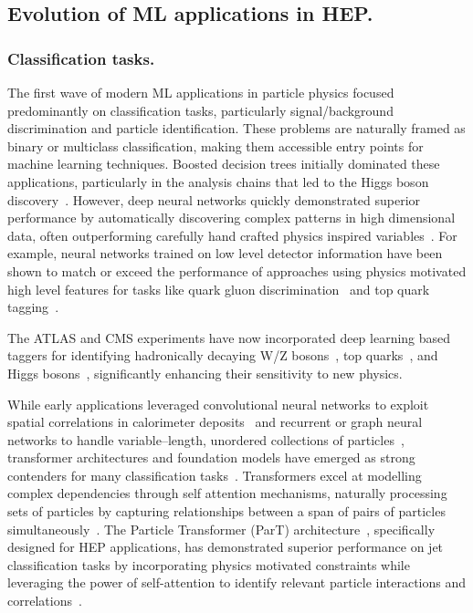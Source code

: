 \subsection{Evolution of ML applications in HEP.}
\subsubsection{Classification tasks.}
        \label{subsubsec:classification-tasks}
The first wave of modern ML applications in particle physics focused predominantly on classification tasks, particularly signal/background discrimination and particle identification.
%
These problems are naturally framed as binary or multiclass classification, making them accessible entry points for machine learning techniques.
%
Boosted decision trees initially dominated these applications, particularly in the analysis chains that led to the Higgs boson discovery~\cite{Chen2014HiggsTrees}.
%
However, deep neural networks quickly demonstrated superior performance by automatically discovering complex patterns in high dimensional data, often outperforming carefully hand crafted physics inspired variables~\cite{Baldi2014SearchingLearning, Baldi2015EnhancedLearning, Baldi2021DeepScience}.
%
For example, neural networks trained on low level detector information have been shown to match or exceed the performance of approaches using physics motivated high level features for tasks like quark gluon discrimination~\cite{Lee2019Quark-GluonNetworks} and top quark tagging~\cite{Pearkes2017JetTagging}.

The ATLAS and CMS experiments have now incorporated deep learning based taggers for identifying hadronically decaying W/Z bosons~\cite{Chen2020BoostedLearning}, top quarks~\cite{Sirunyan_2020}, and Higgs bosons~\cite{2023TransformerATLAS}, significantly enhancing their sensitivity to new physics.

While early applications leveraged convolutional neural networks to exploit spatial correlations in calorimeter deposits~\cite{deOliveira2016Jet-imagesEdition, Komiske2018DeepDiscrimination} and recurrent or graph neural networks to handle variable--length, unordered collections of particles~\cite{Shlomi2020GraphPhysics, Qu2020ParticleNet:Clouds}, transformer architectures and foundation models have emerged as strong contenders for many classification tasks~\cite{Qu2022ParticleTagging, Mikuni2025SolvingModels, VanStroud2024TransformersPhysics}.
%
Transformers excel at modelling complex dependencies through self attention mechanisms, naturally processing sets of particles by capturing relationships between a span of pairs of particles simultaneously~\cite{Vaswani2017AttentionNeed}.
%
The Particle Transformer (ParT) architecture~\cite{Qu2022ParticleTagging}, specifically designed for HEP applications, has demonstrated superior performance on jet classification tasks by incorporating physics motivated constraints while leveraging the power of self-attention to identify relevant particle interactions and correlations~\cite{Wang2024InterpretingTagging}.

